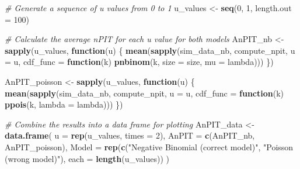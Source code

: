 \documentclass[
  letterpaper,
]{krantz}
\newenvironment{Shaded}{\begin{snugshade}}{\end{snugshade}}
\newcommand{\AttributeTok}[1]{\textcolor[rgb]{0.13,0.29,0.53}{#1}}
\newcommand{\CommentTok}[1]{\textcolor[rgb]{0.56,0.35,0.01}{\textit{#1}}}
\newcommand{\ControlFlowTok}[1]{\textcolor[rgb]{0.13,0.29,0.53}{\textbf{#1}}}
\newcommand{\DecValTok}[1]{\textcolor[rgb]{0.00,0.00,0.81}{#1}}
\newcommand{\FunctionTok}[1]{\textcolor[rgb]{0.13,0.29,0.53}{\textbf{#1}}}
\newcommand{\NormalTok}[1]{#1}
\newcommand{\OtherTok}[1]{\textcolor[rgb]{0.56,0.35,0.01}{#1}}
\newcommand{\StringTok}[1]{\textcolor[rgb]{0.31,0.60,0.02}{#1}}
\begin{document}
\begin{Shaded}
\begin{Highlighting}[]
\CommentTok{\# Generate a sequence of u values from 0 to 1}
\NormalTok{u\_values }\OtherTok{\textless{}{-}} \FunctionTok{seq}\NormalTok{(}\DecValTok{0}\NormalTok{, }\DecValTok{1}\NormalTok{, }\AttributeTok{length.out =} \DecValTok{100}\NormalTok{)}

\CommentTok{\# Calculate the average nPIT for each u value for both models}
\NormalTok{AnPIT\_nb }\OtherTok{\textless{}{-}} \FunctionTok{sapply}\NormalTok{(u\_values, }\ControlFlowTok{function}\NormalTok{(u) \{}
  \FunctionTok{mean}\NormalTok{(}\FunctionTok{sapply}\NormalTok{(sim\_data\_nb, compute\_npit, }\AttributeTok{u =}\NormalTok{ u, }\AttributeTok{cdf\_func =} \ControlFlowTok{function}\NormalTok{(k) }\FunctionTok{pnbinom}\NormalTok{(k, }\AttributeTok{size =}\NormalTok{ size, }\AttributeTok{mu =}\NormalTok{ lambda)))}
\NormalTok{\})}

\NormalTok{AnPIT\_poisson }\OtherTok{\textless{}{-}} \FunctionTok{sapply}\NormalTok{(u\_values, }\ControlFlowTok{function}\NormalTok{(u) \{}
  \FunctionTok{mean}\NormalTok{(}\FunctionTok{sapply}\NormalTok{(sim\_data\_nb, compute\_npit, }\AttributeTok{u =}\NormalTok{ u, }\AttributeTok{cdf\_func =} \ControlFlowTok{function}\NormalTok{(k) }\FunctionTok{ppois}\NormalTok{(k, }\AttributeTok{lambda =}\NormalTok{ lambda)))}
\NormalTok{\})}

\CommentTok{\# Combine the results into a data frame for plotting}
\NormalTok{AnPIT\_data }\OtherTok{\textless{}{-}} \FunctionTok{data.frame}\NormalTok{(}
  \AttributeTok{u =} \FunctionTok{rep}\NormalTok{(u\_values, }\AttributeTok{times =} \DecValTok{2}\NormalTok{),}
  \AttributeTok{AnPIT =} \FunctionTok{c}\NormalTok{(AnPIT\_nb, AnPIT\_poisson),}
  \AttributeTok{Model =} \FunctionTok{rep}\NormalTok{(}\FunctionTok{c}\NormalTok{(}\StringTok{"Negative Binomial (correct model)"}\NormalTok{, }\StringTok{"Poisson (wrong model)"}\NormalTok{), }\AttributeTok{each =} \FunctionTok{length}\NormalTok{(u\_values))}
\NormalTok{)}


\end{Highlighting}
\end{Shaded}
\end{document}
